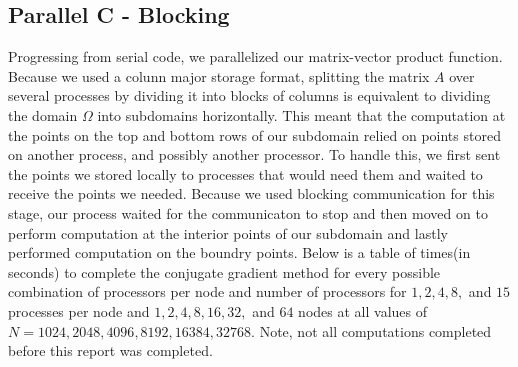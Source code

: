 \documentclass[11pt]{article}
\begin{document}
\subsection{Parallel C - Blocking}
Progressing from serial code, we parallelized our matrix-vector product function. Because we used a colunn major storage format, splitting the matrix $A$ over several processes by dividing it into blocks of columns is equivalent to dividing the domain $\Omega$ into subdomains horizontally. This meant that the computation at the points on the top and bottom rows of our subdomain relied on points stored on another process, and possibly another processor. To handle this, we first sent the points we stored locally to processes that would need them and waited to receive the points we needed. Because we used blocking communication for this stage, our process waited for the communicaton to stop and then moved on to perform computation at the interior points of our subdomain and lastly performed computation on the boundry points.
Below is a table of times(in seconds) to complete the conjugate gradient method for every possible combination of processors per node and number of processors for $1,2,4,8,$ and $15$ processes per node and $1,2,4,8,16,32,$ and $64$ nodes at all values of $N=1024, 2048, 4096, 8192, 16384, 32768$. Note, not all computations completed before this report was completed.
\end{document}
